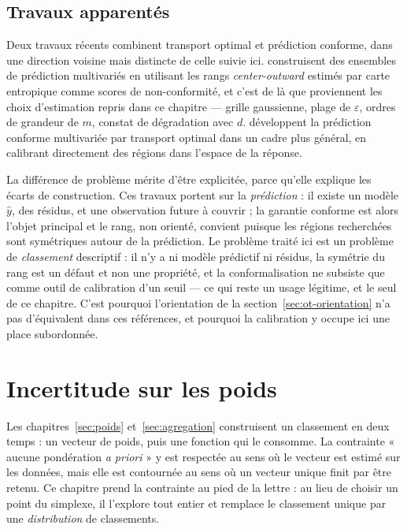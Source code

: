 \documentclass[11pt,a4paper]{article}
\theoremstyle{definition}
\theoremstyle{remark}
\begin{document}
\bigskip

\subsection{Travaux apparentés}
\label{sec:ot-apparentes}

\medskip

Deux travaux récents combinent transport optimal et prédiction conforme, dans une direction
voisine mais distincte de celle suivie ici. \citet{klein2025} construisent des ensembles de
prédiction multivariés en utilisant les rangs \emph{center-outward} estimés par carte
entropique comme scores de non-conformité, et c'est de là que proviennent les choix
d'estimation repris dans ce chapitre --- grille gaussienne, plage de $\varepsilon$, ordres
de grandeur de $m$, constat de dégradation avec $d$. \citet{thurin2025} développent la
prédiction conforme multivariée par transport optimal dans un cadre plus général, en
calibrant directement des régions dans l'espace de la réponse.

\bigskip

La différence de problème mérite d'être explicitée, parce qu'elle explique les écarts de
construction. Ces travaux portent sur la \emph{prédiction} : il existe un modèle
$\hat{y}$, des résidus, et une observation future à couvrir ; la garantie conforme est
alors l'objet principal et le rang, non orienté, convient puisque les régions recherchées
sont symétriques autour de la prédiction. Le problème traité ici est un problème de
\emph{classement} descriptif : il n'y a ni modèle prédictif ni résidus, la symétrie du rang
est un défaut et non une propriété, et la conformalisation ne subsiste que comme outil de
calibration d'un seuil --- ce qui reste un usage légitime, et le seul de ce chapitre. C'est
pourquoi l'orientation de la section~\ref{sec:ot-orientation} n'a pas d'équivalent dans ces
références, et pourquoi la calibration y occupe ici une place subordonnée.

\section{Incertitude sur les poids}
\label{sec:smaa}

\medskip

Les chapitres~\ref{sec:poids} et~\ref{sec:agregation} construisent un classement en deux
temps : un vecteur de poids, puis une fonction qui le consomme. La contrainte « aucune
pondération \emph{a priori} » y est respectée au sens où le vecteur est estimé sur les
données, mais elle est contournée au sens où un vecteur unique finit par être retenu. Ce
chapitre prend la contrainte au pied de la lettre : au lieu de choisir un point du
simplexe, il l'explore tout entier et remplace le classement unique par une
\emph{distribution} de classements.
\end{document}
